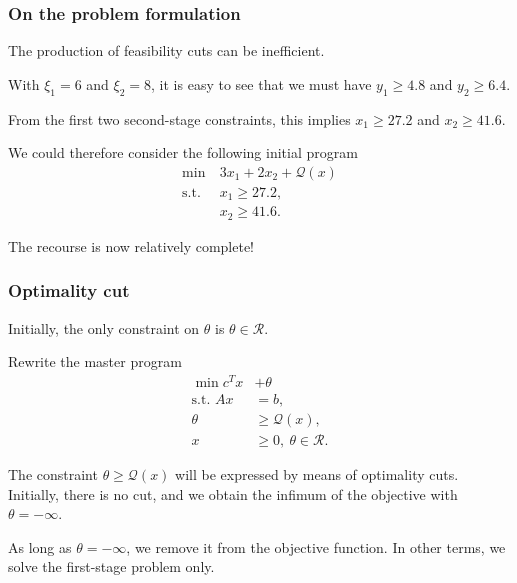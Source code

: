 \documentclass{beamer}
\def\rit{\mathcal{R}}
\begin{document}
\begin{frame}
	\frametitle{On the problem formulation}
	
	The production of feasibility cuts can be inefficient.
	
	\mbox{}
	
	With $\xi_1 = 6$ and $\xi_2 = 8$, it is easy to see that we must have $y_1 \geq	4.8$ and $y_2 \geq 6.4$.
	
	\mbox{}
	
	From the first two second-stage constraints, this implies $x_1 \geq 27.2$ and $x_2 \geq 41.6$.
	
	\mbox{}
	
	We could therefore consider the following initial program
	\begin{align*}
	\min\ & 3x_1 + 2x_2 + \mathcal{Q}(x) \\
	\mbox{s.t. } & x_1 \geq 27.2, \\
	& x_2 \geq 41.6.
	\end{align*}
	
	The recourse is now relatively complete!
	
\end{frame}


\begin{frame}
\frametitle{Optimality cut}
	
Initially, the only constraint on $\theta$ is $\theta \in \rit$.
	
\mbox{}
	
Rewrite the master program
\begin{align*}
\min c^Tx & + \theta \\
\mbox{s.t. } Ax & = b, \\
\theta &\geq \mathcal{Q}(x),\\
x & \geq 0,\ \theta \in \rit.
\end{align*}
	
The constraint $\theta \geq \mathcal{Q}(x)$ will be expressed by means of optimality cuts.
Initially, there is no cut, and we obtain the infimum of the objective with $\theta = -\infty$.
	
\mbox{}
	
As long as $\theta = -\infty$, we remove it from the objective function.
In other terms, we solve the first-stage problem only.
	
\end{frame}
\end{document}
